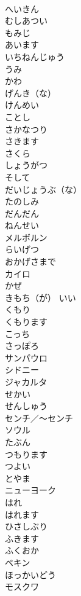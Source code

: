 \documentclass[8pt]{extreport}
\begin{document}
\begin{CJK}{UTF8}{min}
\\	へいきん	
\\	むしあつい	
\\	もみじ	
\\	あいます	
\\	いちねんじゅう	
\\	うみ	
\\	かわ	
\\	げんき（な）	
\\	けんめい	
\\	ことし	
\\	さかなつり	
\\	さきます	
\\	さくら	
\\	しょうがつ	
\\	そして	
\\	だいじょうぶ（な）	
\\	たのしみ	
\\	だんだん	
\\	ねんせい	
\\	メルボルン	
\\	らいげつ	
\\	おかげさまで	
\\	カイロ	
\\	かぜ	
\\	きもち（が） いい	
\\	くもり	
\\	くもります	
\\	こっち	
\\	さっぽろ	
\\	サンパウロ	
\\	シドニー	
\\	ジャカルタ	
\\	せかい	
\\	せんしゅう	
\\	センチ／～センチ	
\\	ソウル	
\\	たぶん	
\\	つもります	
\\	つよい	
\\	とやま	
\\	ニューヨーク	
\\	はれ	
\\	はれます	
\\	ひさしぶり	
\\	ふきます	
\\	ふくおか	
\\	ペキン	
\\	ほっかいどう	
\\	モスクワ	

\end{CJK}
\end{document}
